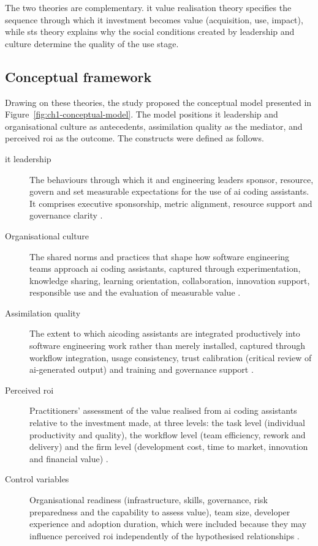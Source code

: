 The two theories are complementary. \gls{it} value realisation theory specifies the sequence through which \gls{it} investment becomes value (acquisition, use, impact), while \gls{sts} theory explains why the social conditions created by leadership and culture determine the quality of the use stage.

\subsection{Conceptual framework}
\label{subsec:ch1-conceptual}

Drawing on these theories, the study proposed the conceptual model presented in Figure~\ref{fig:ch1-conceptual-model}. The model positions \gls{it} leadership and organisational culture as antecedents, assimilation quality as the mediator, and perceived \gls{roi} as the outcome. The constructs were defined as follows.

\begin{description}
	\item[\gls{it} leadership] The behaviours through which \gls{it} and engineering leaders sponsor, resource, govern and set measurable expectations for the use of \gls{ai} coding assistants. It comprises executive sponsorship, metric alignment, resource support and governance clarity \parencite{Johnk2021, Schneider2023, DORA2025}.
	\item[Organisational culture] The shared norms and practices that shape how software engineering teams approach \gls{ai} coding assistants, captured through experimentation, knowledge sharing, learning orientation, collaboration, innovation support, responsible use and the evaluation of measurable value \parencite{Murire2024, EdmondsonBransby2023, An2024}.
	\item[Assimilation quality] The extent to which \gls{ai}coding assistants are integrated productively into software engineering work rather than merely installed, captured through workflow integration, usage consistency, trust calibration (critical review of \gls{ai}-generated output) and training and governance support \parencite{AbdulWahab2024, Weber2023, Sergeyuk2025}.
	\item[Perceived \gls{roi}] Practitioners' assessment of the value realised from \gls{ai} coding assistants relative to the investment made, at three levels: the task level (individual productivity and quality), the workflow level (team efficiency, rework and delivery) and the firm level (development cost, time to market, innovation and financial value) \parencite{Enholm2022, Mikalef2021}.
	\item[Control variables] Organisational readiness (infrastructure, skills, governance, risk preparedness and the capability to assess value), team size, developer experience and adoption duration, which were included because they may influence perceived \gls{roi} independently of the hypothesised relationships \parencite{Isagah2024, Cui2026}.
\end{description}

